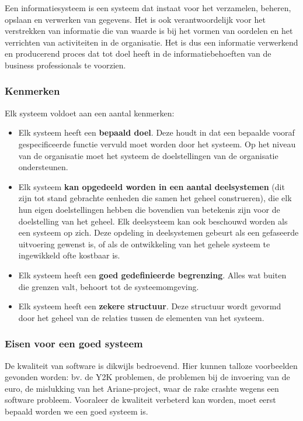 Een informatiesysteem is een systeem dat instaat voor het verzamelen, beheren, opslaan en verwerken van gegevens. Het is ook verantwoordelijk voor het verstrekken van informatie die van waarde is bij het vormen van oordelen en het verrichten van activiteiten in de organisatie. Het is dus een informatie verwerkend en producerend proces dat tot doel heeft in de informatiebehoeften van de business professionals te voorzien.

\subsubsection{Kenmerken}

Elk systeem voldoet aan een aantal kenmerken:

\begin{itemize}
\item Elk systeem heeft een \textbf{bepaald doel}. Deze houdt in dat een bepaalde vooraf gespecificeerde functie vervuld moet worden door het systeem. Op het niveau van de organisatie moet het systeem de doelstellingen van de organisatie ondersteunen.
\item Elk systeem \textbf{kan opgedeeld worden in een aantal deelsystemen} (dit zijn tot stand gebrachte eenheden die samen het geheel construeren), die elk hun eigen doelstellingen hebben die bovendien van betekenis zijn voor de doelstelling van het geheel. Elk deelsysteem kan ook beschouwd worden als een systeem op zich. Deze opdeling in deelsystemen gebeurt als een gefaseerde uitvoering gewenst is, of als de ontwikkeling van het gehele systeem te ingewikkeld ofte kostbaar is.
\item Elk systeem heeft een \textbf{goed gedefinieerde begrenzing}. Alles wat buiten die grenzen valt, behoort tot de systeemomgeving.
\item Elk systeem heeft een \textbf{zekere structuur}. Deze structuur wordt gevormd door het geheel van de relaties tussen de elementen van het systeem.
\end{itemize}


\subsubsection{Eisen voor een goed systeem}

De kwaliteit van software is dikwijls bedroevend. Hier kunnen talloze voorbeelden gevonden worden: bv. de Y2K problemen, de problemen bij de invoering van de euro, de mislukking van het Ariane-project, waar de rake crashte wegens een software probleem.
Vooraleer de kwaliteit verbeterd kan worden, moet eerst bepaald worden we een goed systeem is.

